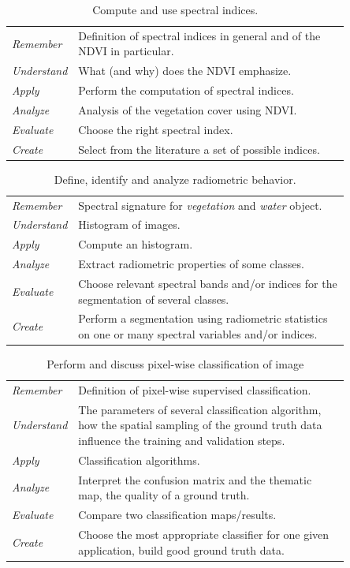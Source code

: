 \documentclass[a4paper,11pt,DIV=18]{scrartcl}
\begin{document}
\begin{table}[htbp]
\caption{\label{tab:org2542c25}
Compute and use spectral indices.}
\centering
\begin{tabular}{lp{0.85\linewidth}}
\toprule
\emph{Remember} & Definition of spectral indices in general and of the NDVI in particular.\\
\emph{Understand} & What (and why) does the NDVI emphasize.\\
\emph{Apply} & Perform the computation of spectral indices.\\
\emph{Analyze} & Analysis of the vegetation cover using NDVI.\\
\emph{Evaluate} & Choose the right spectral index.\\
\emph{Create} & Select from the literature a set of possible indices.\\
\bottomrule
\end{tabular}
\end{table}

\begin{table}[htbp]
\caption{\label{tab:orgde1ec49}
Define, identify and analyze radiometric behavior.}
\centering
\begin{tabular}{lp{0.85\linewidth}}
\toprule
\emph{Remember} & Spectral signature for \emph{vegetation} and \emph{water} object.\\
\emph{Understand} & Histogram of images.\\
\emph{Apply} & Compute an histogram.\\
\emph{Analyze} & Extract radiometric properties of some classes.\\
\emph{Evaluate} & Choose relevant  spectral  bands and/or  indices for  the  segmentation of several classes.\\
\emph{Create} & Perform a segmentation using radiometric statistics on one or many spectral variables and/or indices.\\
\bottomrule
\end{tabular}
\end{table}

\begin{table}[htbp]
\caption{\label{tab:orgb0b6de0}
Perform and discuss pixel-wise classification of image}
\centering
\begin{tabular}{lp{0.85\linewidth}}
\toprule
\emph{Remember} & Definition of pixel-wise supervised classification.\\
\emph{Understand} & The parameters of  several classification algorithm, how  the spatial sampling of the ground truth data influence the training  and validation steps.\\
\emph{Apply} & Classification algorithms.\\
\emph{Analyze} & Interpret the confusion matrix and the thematic map, the  quality of a ground truth.\\
\emph{Evaluate} & Compare two classification maps/results.\\
\emph{Create} & Choose the most appropriate classifier for one given  application, build good ground truth data.\\
\bottomrule
\end{tabular}
\end{table}
\end{document}
